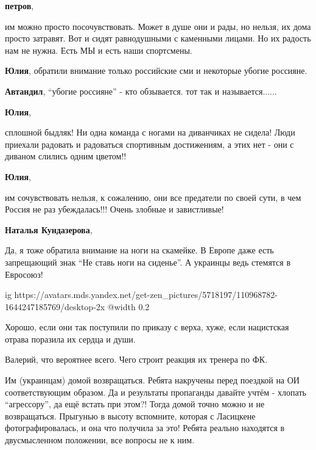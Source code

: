\begin{itemize}
\begin{itemize}
\textbf{петров}, 

им можно просто посочувствовать. Может в душе они и рады, но нельзя, их дома
просто затравят. Вот и сидят равнодушными с каменными лицами. Но их радость нам
не нужна. Есть МЫ и есть наши спортсмены.

\textbf{Юлия}, обратили внимание только российские сми и некоторые убогие россияне.

\textbf{Автандил}, \enquote{убогие россияне} - кто обзывается. тот так и называется......

\textbf{Юлия}, 

сплошной быдляк! Ни одна команда с ногами на диванчиках не сидела! Люди
приехали радовать и радоваться спортивным достижениям, а этих нет - они с
диваном слились одним цветом!!

\textbf{Юлия}, 

им сочувствовать нельзя, к сожалению, они все предатели по своей сути, в чем
Россия не раз убеждалась!!! Очень злобные и завистливые!

\textbf{Наталья Кундазерова}, 

Да, я тоже обратила внимание на ноги на скамейке. В Европе даже есть
запрещающий знак \enquote{Не ставь ноги на сиденье}. А украинцы ведь стемятся в
Евросоюз!

\ifcmt
  ig https://avatars.mds.yandex.net/get-zen_pictures/5718197/110968782-1644247185769/desktop-2x
  @width 0.2
\fi

\end{itemize} %


Хорошо, если они так поступили по приказу с верха, хуже, если нацистская отрава
поразила их сердца и души.


Валерий, что вероятнее всего. Чего строит реакция их тренера по ФК.


Им (украинцам) домой возвращаться. Ребята накручены перед поездкой на ОИ
соответствующим образом. Да и результаты пропаганды давайте учтём - хлопать
\enquote{агрессору}, да ещё встать при этом?! Тогда домой точно можно и не
возвращаться. Прыгунью в высоту вспомните, которая с Ласицкене
фотографировалась, и она что получила за это! Ребята реально находятся в
двусмысленном положении, все вопросы не к ним.


\end{itemize}
